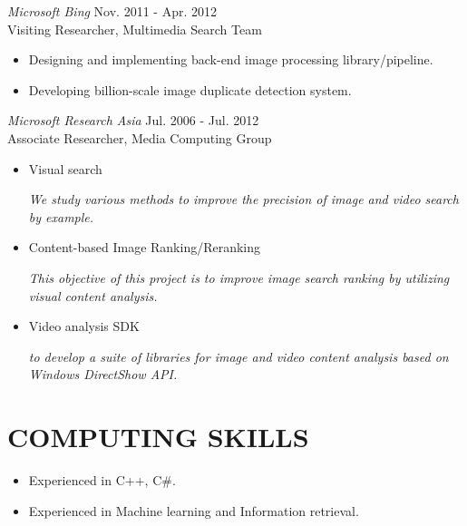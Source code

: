 \documentclass{res}
\begin{document}
\begin{resume}
{\sl Microsoft Bing} \hfill        Nov. 2011 - Apr. 2012 \\
Visiting  Researcher, Multimedia Search Team
    \begin{itemize} \itemsep 1pt %
    \item Designing and implementing back-end image processing library/pipeline.
    \item Developing billion-scale image duplicate detection system.
    \end{itemize}

{\sl Microsoft Research Asia} \hfill        Jul. 2006 - Jul. 2012 \\
Associate Researcher, Media Computing Group

   \begin{itemize} \itemsep 1pt %
   \item Visual search

   \emph{We study various methods to improve the precision of image and video search by example.}


   \item Content-based Image Ranking/Reranking

   \emph{This objective of this project is to improve image search ranking by utilizing visual content analysis.}

   \item Video analysis SDK

    \emph{to develop a suite of libraries for image and video content
    analysis based on Windows DirectShow API. }

 \end{itemize}

%

\section{{COMPUTING SKILLS }}
\begin{itemize}
    \item Experienced in C++, C\#.
    \item Experienced in Machine learning and Information retrieval.
\end{itemize}



\end{resume}
\end{document}
